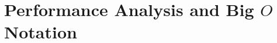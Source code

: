 \section{Performance Analysis and Big $O$ Notation}%
\label{sec:fundamentals--performance-analysis-and-big-o-notation}



